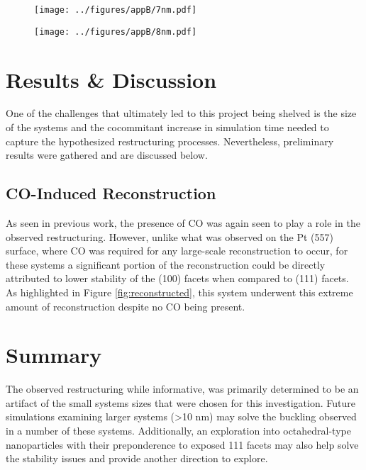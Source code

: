 \begin{landscape}
\begin{figure}[p!]
  \texttt{[image: ../figures/appB/7nm.pdf]}
  \caption{}
  \label{fig:7nm}
\end{figure}
\end{landscape}


\begin{landscape}
\begin{figure}[p!]
  \texttt{[image: ../figures/appB/8nm.pdf]}
  \caption{}
  \label{fig:8nm}
\end{figure}
\end{landscape}



\section{Results \& Discussion}
One of the challenges that ultimately led to this project being shelved is the
size of the systems and the cocommitant increase in simulation time needed to
capture the hypothesized restructuring processes. Nevertheless, preliminary
results were gathered and are discussed below.

\subsection{CO-Induced Reconstruction}
As seen in previous work\citep{Michalka:2013aa}, the presence of CO was again seen to play a
role in the observed restructuring. However, unlike what was observed on the Pt
(557) surface\citep{Michalka:2013aa}, where CO was required for any large-scale reconstruction
to occur, for these systems a significant portion of the reconstruction could
be directly attributed to lower stability of the (100) facets when compared to
(111) facets. As highlighted in Figure \ref{fig:reconstructed}, this system
underwent this extreme amount of reconstruction despite no CO being present. 

\section{Summary}
The observed restructuring while informative, was primarily determined to be an
artifact of the small systems sizes that were chosen for this investigation.
Future simulations examining larger systems (>10 nm) may solve the buckling
observed in a number of these systems. Additionally, an exploration into
octahedral-type nanoparticles with their preponderence to exposed {111} facets
may also help solve the stability issues and provide another direction to explore.
